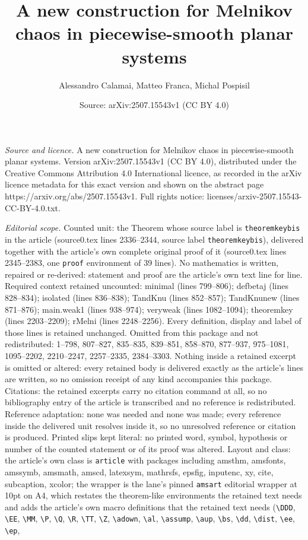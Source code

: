 \documentclass[10pt,a4paper]{amsart}
\title[A new construction for Melnikov chaos in piecewise-smooth pl]{A new construction for Melnikov chaos in piecewise-smooth planar systems}
\author{Alessandro Calamai, Matteo Franca, Michal Pospisil}
\date{Source: arXiv:2507.15543v1 (CC BY 4.0)}
\begin{document}
\maketitle

\noindent\emph{Source and licence.} A new construction for Melnikov chaos in piecewise-smooth planar systems. Version arXiv:2507.15543v1 (CC BY 4.0), distributed under the Creative Commons Attribution 4.0 International licence, as recorded in the arXiv licence metadata for this exact version and shown on the abstract page https://arxiv.org/abs/2507.15543v1. Full rights notice: licenses/arxiv-2507.15543-CC-BY-4.0.txt.\par\smallskip

\noindent\textit{Editorial scope.} Counted unit: the Theorem whose source label is \texttt{theoremkeybis} in the article (source0.tex lines 2336--2344, source label \texttt{theoremkeybis}), delivered together with the article's own complete original proof of it (source0.tex lines 2345--2383, one \texttt{proof} environment of 39 lines). No mathematics is written, repaired or re-derived: statement and proof are the article's own text line for line. Required context retained uncounted: minimal (lines 799--806); defbetaj (lines 828--834); isolated (lines 836--838); TandKnu (lines 852--857); TandKnunew (lines 871--876); main.weak1 (lines 938--974); veryweak (lines 1082--1094); theoremkey (lines 2203--2209); rMelni (lines 2248--2256). Every definition, display and label of those lines is retained unchanged. Omitted from this package and not redistributed: 1--798, 807--827, 835--835, 839--851, 858--870, 877--937, 975--1081, 1095--2202, 2210--2247, 2257--2335, 2384--3303. Nothing inside a retained excerpt is omitted or altered: every retained body is delivered exactly as the article's lines are written, so no omission receipt of any kind accompanies this package. Citations: the retained excerpts carry no citation command at all, so no bibliography entry of the article is transcribed and no reference is redistributed. Reference adaptation: none was needed and none was made; every reference inside the delivered unit resolves inside it, so no unresolved reference or citation is produced. Printed slips kept literal: no printed word, symbol, hypothesis or number of the counted statement or of its proof was altered. Layout and class: the article's own class is \texttt{article} with packages including amsthm, amsfonts, amssymb, amsmath, amscd, latexsym, mathrsfs, epsfig, inputenc, xy, cite, subcaption, xcolor; the wrapper is the lane's pinned \texttt{amsart} editorial wrapper at 10pt on A4, which restates the theorem-like environments the retained text needs and adds the article's own macro definitions that the retained text needs (\texttt{\textbackslash DDD}, \texttt{\textbackslash EE}, \texttt{\textbackslash MM}, \texttt{\textbackslash P}, \texttt{\textbackslash Q}, \texttt{\textbackslash R}, \texttt{\textbackslash TT}, \texttt{\textbackslash Z}, \texttt{\textbackslash adown}, \texttt{\textbackslash al}, \texttt{\textbackslash assump}, \texttt{\textbackslash aup}, \texttt{\textbackslash bs}, \texttt{\textbackslash dd}, \texttt{\textbackslash dist}, \texttt{\textbackslash ee}, \texttt{\textbackslash ep}, 
\end{document}
